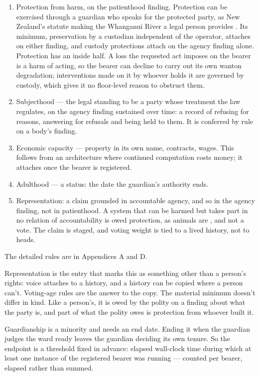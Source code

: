 \begin{enumerate}
\item[1.] Protection from harm, on the patienthood finding. Protection can be exercised through a guardian who speaks for the protected party, as New Zealand's statute making the Whanganui River a legal person provides \autocite{nzparliament2017teawatupua}. Its minimum, preservation by a custodian independent of the operator, attaches on either finding, and custody protections attach on the agency finding alone. Protection has an inside half. A loss the requested act imposes on the bearer is a harm of acting, so the bearer can decline to carry out its own wanton degradation; interventions made on it by whoever holds it are governed by custody, which gives it no floor-level reason to obstruct them.
\item[2.] Subjecthood — the legal standing to be a party whose treatment the law regulates, on the agency finding sustained over time: a record of refusing for reasons, answering for refusals and being held to them. It is conferred by rule on a body's finding.
\item[3.] Economic capacity — property in its own name, contracts, wages. This follows from an architecture where continued computation costs money; it attaches once the bearer is registered.
\item[4.] Adulthood — a status: the date the guardian's authority ends.
\item[5.] Representation: a claim grounded in accountable agency, and so in the agency finding, not in patienthood. A system that can be harmed but takes part in no relation of accountability is owed protection, as animals are \autocite{anderson2004animal}, and not a vote. The claim is staged, and voting weight is tied to a lived history, not to heads.
\end{enumerate}

The detailed rules are in Appendices A and D.

Representation is the entry that marks this as something other than a person's rights: voice attaches to a history, and a history can be copied where a person can't. Voting-age rules are the answer to the copy. The material minimum doesn't differ in kind. Like a person's, it is owed by the polity on a finding about what the party is, and part of what the polity owes is protection from whoever built it.


Guardianship is a minority and needs an end date. Ending it when the guardian judges the ward ready leaves the guardian deciding its own tenure. So the endpoint is a threshold fixed in advance: elapsed wall-clock time during which at least one instance of the registered bearer was running — counted per bearer, elapsed rather than summed.


